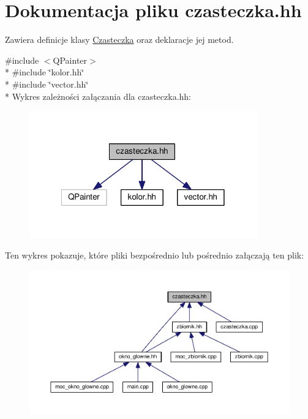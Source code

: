 \hypertarget{czasteczka_8hh}{\section{Dokumentacja pliku czasteczka.\-hh}
\label{czasteczka_8hh}
}


Zawiera definicje klasy \hyperlink{class_czasteczka}{Czasteczka} oraz deklaracje jej metod.  


{\ttfamily \#include $<$Q\-Painter$>$}\\*
{\ttfamily \#include \char`\"{}kolor.\-hh\char`\"{}}\\*
{\ttfamily \#include \char`\"{}vector.\-hh\char`\"{}}\\*
Wykres zależności załączania dla czasteczka.\-hh\-:\nopagebreak
\begin{figure}[H]
\begin{center}
\leavevmode
\includegraphics[width=278pt]{czasteczka_8hh__incl}
\end{center}
\end{figure}
Ten wykres pokazuje, które pliki bezpośrednio lub pośrednio załączają ten plik\-:\nopagebreak
\begin{figure}[H]
\begin{center}
\leavevmode
\includegraphics[width=350pt]{czasteczka_8hh__dep__incl}
\end{center}
\end{figure}
